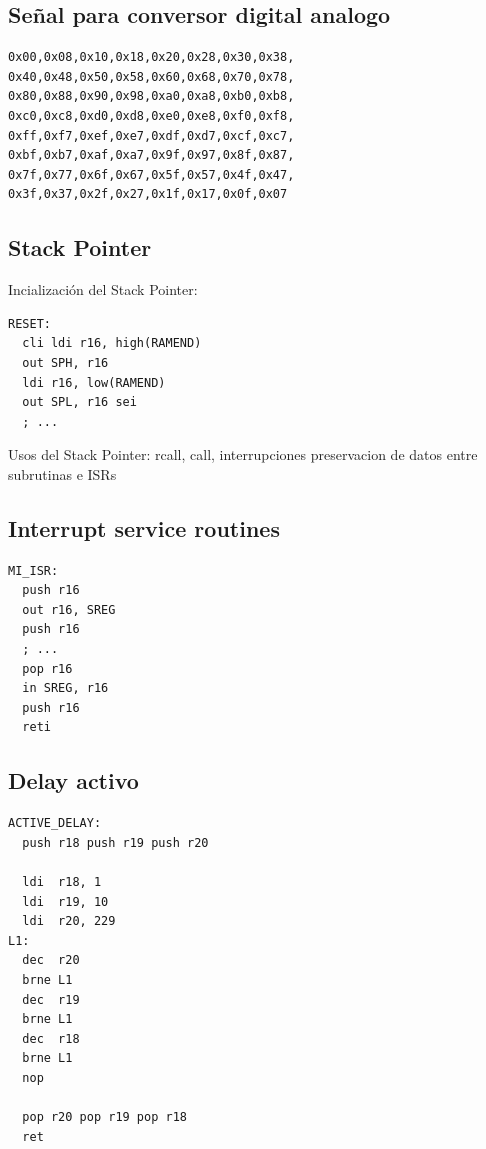 \subsection{Señal para conversor digital analogo}\label{anexo:Senal_para_conversor_digital_analogo}
\begin{verbatim}
0x00,0x08,0x10,0x18,0x20,0x28,0x30,0x38,
0x40,0x48,0x50,0x58,0x60,0x68,0x70,0x78,
0x80,0x88,0x90,0x98,0xa0,0xa8,0xb0,0xb8,
0xc0,0xc8,0xd0,0xd8,0xe0,0xe8,0xf0,0xf8,
0xff,0xf7,0xef,0xe7,0xdf,0xd7,0xcf,0xc7,
0xbf,0xb7,0xaf,0xa7,0x9f,0x97,0x8f,0x87,
0x7f,0x77,0x6f,0x67,0x5f,0x57,0x4f,0x47,
0x3f,0x37,0x2f,0x27,0x1f,0x17,0x0f,0x07
\end{verbatim}

\subsection{Stack Pointer}\label{anexo:Stack_Pointer}

Incialización del Stack Pointer:

\begin{verbatim}
RESET:
  cli ldi r16, high(RAMEND)
  out SPH, r16
  ldi r16, low(RAMEND)
  out SPL, r16 sei
  ; ...
\end{verbatim}

Usos del Stack Pointer: rcall, call, interrupciones
preservacion de datos entre subrutinas e ISRs

\subsection{Interrupt service routines}\label{anexo:Interrupt_Service_Routines}

\begin{verbatim}
MI_ISR:
  push r16
  out r16, SREG
  push r16
  ; ... 
  pop r16
  in SREG, r16
  push r16
  reti
\end{verbatim}

\subsection{Delay activo}\label{anexo:Delay_Activo}
\begin{verbatim}
ACTIVE_DELAY:	
  push r18 push r19 push r20

  ldi  r18, 1
  ldi  r19, 10
  ldi  r20, 229
L1: 
  dec  r20
  brne L1
  dec  r19
  brne L1
  dec  r18
  brne L1
  nop

  pop r20 pop r19 pop r18
  ret
\end{verbatim}

